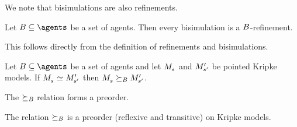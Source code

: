 We note that bisimulations are also refinements.

\begin{proposition}\label{bisimulation-refinement}
Let $\agentsB \subseteq \agents$ be a set of agents. Then every bisimulation is a $B$-refinement.
\end{proposition}

This follows directly from the definition of refinements and bisimulations.

\begin{corollary}\label{bisimilar-refinement}
Let $\agentsB \subseteq \agents$ be a set of agents and let $\kPModel{\kStateS}$ and ${M^{\prime}_{{s}^{\prime}}}$ be pointed Kripke models.
If $\kPModel{\kStateS} \bisimilar \kPModelP{\kStateSP}$ then $\kPModel{\kStateS} \simulatesBs \kPModelP{\kStateSP}$.
\end{corollary}

The $\succeq_{B}$ relation forms a preorder.

\begin{proposition}\label{refinements-preorder}
The relation $\succeq_{B}$ is a preorder (reflexive and transitive) on Kripke models.
\end{proposition}

